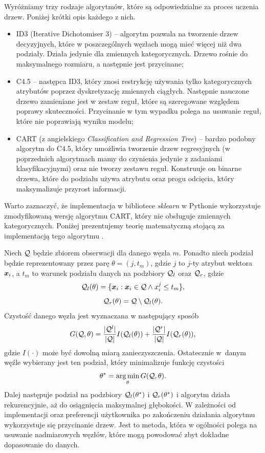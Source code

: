 \documentclass[inzynierska]{pwr_wmat_praca_dyplomowa}
\theoremstyle{plain}
\numberwithin{theorem}{chapter}
\theoremstyle{definition}
\numberwithin{theorem}{chapter}
\DeclareMathOperator*{\argmin}{arg\,min}
\begin{document}
Wyróżniamy trzy rodzaje algorytmów, które są odpowiedzialne za proces uczenia drzew. Poniżej krótki opis każdego z nich.
\begin{itemize}
	\item ID3 (Iterative Dichotomiser 3) -- algorytm pozwala na tworzenie drzew decyzyjnych, które w poszczególnych węzłach mogą mieć więcej niż dwa podziały. Działa jedynie dla zmiennych kategorycznych. Drzewo rośnie do maksymalnego rozmiaru, a następnie jest przycinane;
	\item C4.5 -- następca ID3, który znosi restrykcję używania tylko kategorycznych atrybutów poprzez dyskretyzację zmiennych ciągłych. Następnie nauczone drzewo zamieniane jest w zestaw reguł, które są szeregowane względem poprawy skuteczności. Przycinanie w tym wypadku polega na usuwanie reguł, które nie poprawiają wyniku modelu;
	\item CART (z angielskiego \textit{Classification and Regression Tree}) -- bardzo podobny algorytm do C4.5, który umożliwia tworzenie drzew regresyjnych (w poprzednich algorytmach mamy do czynienia jedynie z zadaniami klasyfikacyjnymi) oraz nie tworzy zestawu reguł. Konstruuje on binarne drzewa, które do podziału używa atrybutu oraz progu odcięcia, który maksymalizuje przyrost informacji.
\end{itemize}
Warto zaznaczyć, że implementacja w bibliotece \textit{sklearn} w Pythonie wykorzystuje zmodyfikowaną wersję algorytmu CART, który nie obsługuje zmiennych kategorycznych. Poniżej prezentujemy teorię matematyczną stojącą za implementacją tego algorytmu \cite{sklearn_api}.

Niech $\mathcal{Q}$ będzie zbiorem obserwacji dla danego węzła $m$. Ponadto niech podział będzie reprezentowany przez parę $\theta = (j, t_m)$, gdzie $j$ to $j$-ty atrybut wektora $\boldsymbol{x}_i$, a $t_m$ to warunek podziału danych na podzbiory $\mathcal{Q}_l$ oraz $\mathcal{Q}_r$, gdzie
$$ \mathcal{Q}_l (\theta) = \{ \boldsymbol{x}_i : \boldsymbol{x}_i \in \mathcal{Q} \land x^{j}_i \leq t_m \} \text{,} $$
$$ \mathcal{Q}_r (\theta) = \mathcal{Q} \setminus \mathcal{Q}_l(\theta) \text{.} $$
Czystość danego węzła jest wyznaczana w następujący sposób
$$ G(\mathcal{Q}, \theta) = \frac{|\mathcal{Q}^l|}{|\mathcal{Q}|} I(\mathcal{Q}_l (\theta)) + \frac{|\mathcal{Q}^r|}{|\mathcal{Q}|} I(\mathcal{Q}_r (\theta)) \text{,}$$
gdzie $I(\cdot)$ może być dowolną miarą zanieczyszczenia. Ostatecznie w~danym węźle wybierany jest ten podział, który minimalizuje funkcję czystości
$$ \theta^* = \argmin_\theta G(\ku, \theta) \text{.}$$
Dalej następuje podział na podzbiory $\mathcal{Q}_l (\theta^*)$ i $\mathcal{Q}_r (\theta^*)$ i algorytm działa rekurencyjnie, aż do osiągnięcia maksymalnej głębokości.
W zależności od implementacji oraz preferencji użytkownika po zakończeniu działania algorytmu wykorzystuje się przycinanie drzew. Jest to metoda, która w ogólności polega na usuwanie nadmiarowych węzłów, które mogą powodować zbyt dokładne dopasowanie do danych. 
\end{document}

